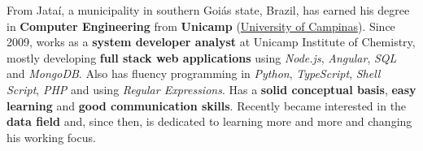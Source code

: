

\begin{cvparagraph}

From Jataí, a municipality in southern Goiás state, Brazil, has earned his degree in \textbf{Computer Engineering} from \textbf{Unicamp} (\href{https://en.wikipedia.org/wiki/University_of_Campinas}{University of Campinas}). Since 2009, works as a \textbf{system developer analyst} at Unicamp Institute of Chemistry, mostly developing \textbf{full stack web applications} using \textit{Node.js}, \textit{Angular}, \textit{SQL} and \textit{MongoDB}. Also has fluency programming in \textit{Python}, \textit{TypeScript}, \textit{Shell Script}, \textit{PHP} and using \textit{Regular Expressions}. Has a \textbf{solid conceptual basis}, \textbf{easy learning} and \textbf{good communication skills}. Recently became interested in the \textbf{data field} and, since then, is dedicated to learning more and more and changing his working focus.
\end{cvparagraph}
